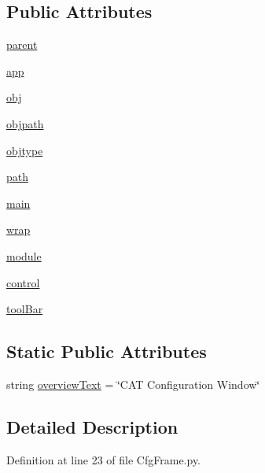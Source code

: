 \subsection*{Public Attributes}
\begin{DoxyCompactItemize}
\item 
\hyperlink{classCfgFrame_1_1CfgFrame_aa2bef7a3e39a5594300fa8e937188cb6}{parent}
\item 
\hyperlink{classCfgFrame_1_1CfgFrame_a16ddc4cc2acb83418a38eb3585ee0cf1}{app}
\item 
\hyperlink{classCfgFrame_1_1CfgFrame_a5035fd7edabdfbf2919ba8ae47b2cdf0}{obj}
\item 
\hyperlink{classCfgFrame_1_1CfgFrame_a0a33bcbfbac5e80e5c4d0069ed9d6c91}{objpath}
\item 
\hyperlink{classCfgFrame_1_1CfgFrame_a224427c3ba9e154dbdf952a8150cd254}{objtype}
\item 
\hyperlink{classCfgFrame_1_1CfgFrame_ae52aeb447fb28afe9351980b60bdd63b}{path}
\item 
\hyperlink{classCfgFrame_1_1CfgFrame_a02cd4c7a142914bd3d12956ee3d41f70}{main}
\item 
\hyperlink{classCfgFrame_1_1CfgFrame_ac0c4e476c6ffc2a0cd485c6c11b4178d}{wrap}
\item 
\hyperlink{classCfgFrame_1_1CfgFrame_a4272c3118c86b430eef4cfea3e6ebb91}{module}
\item 
\hyperlink{classCfgFrame_1_1CfgFrame_a070c23f41ec4e00d48d1be8113f54eed}{control}
\item 
\hyperlink{classCfgFrame_1_1CfgFrame_a8bfc109a2a8e05a0fa21262b0692727b}{tool\+Bar}
\end{DoxyCompactItemize}
\subsection*{Static Public Attributes}
\begin{DoxyCompactItemize}
\item 
string \hyperlink{classCfgFrame_1_1CfgFrame_ac38a04df70f0af1945810ddecc548cd5}{overview\+Text} = \char`\"{}C\+AT Configuration Window\char`\"{}
\end{DoxyCompactItemize}


\subsection{Detailed Description}


Definition at line 23 of file Cfg\+Frame.\+py.




